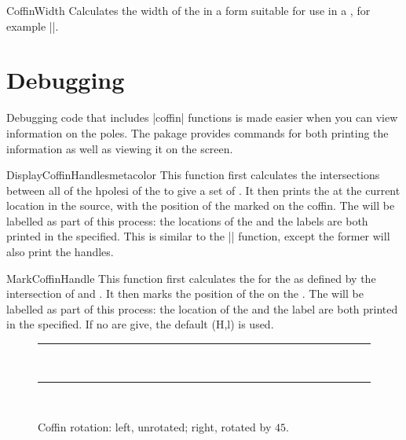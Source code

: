  \begin{docCommand}{CoffinWidth}{ }
   Calculates the width of the  in a form
   suitable for use in a , for example
   |\setlength{\mylength}{\CoffinWidth\ExampleCoffin}|.
 \end{docCommand} 
    
\section{Debugging}

Debugging code that includes |coffin| functions is made easier when you can view information on the
poles. The pakage provides commands for both printing the information as well as viewing it on the screen.

\begin{docCommand}{DisplayCoffinHandles}{meta{color}}
This function first calculates the intersections between all of the hpolesi of the  to
give a set of . It then prints the  at the current location in the source,
with the position of the  marked on the coffin. The  will be labelled
as part of this process: the locations of the  and the labels are both printed in
the  specified. This is similar to the |\TypesetCoffin| function, except the former will also print
the handles. 
\end{docCommand}
  
\begin{docCommand}{MarkCoffinHandle}{ }  
This function first calculates the  for the  as defined by the intersection
of  and . It then marks the position of the  on the . The
 will be labelled as part of this process: the location of the  and the
label are both printed in the  specified. If no  are give, the default (H,l) is
used.
\end{docCommand}
  
   \begin{figure}
     \hfil
     \SetHorizontalCoffin\ExampleCoffin
       {%
         \color{black!10!white}\rule{0.5 in}{1 in}^^A
         \color{black!20!white}\rule{0.5 in}{1 in}^^A
       }
     \begin{minipage}{0.4\textwidth}
       \DisplayCoffinHandles{}
     \end{minipage}
     \hfil
     \begin{minipage}{0.4\textwidth}
       \RotateCoffin{}
       \DisplayCoffinHandles{}
     \end{minipage}
     \hfil
     \caption{Coffin rotation: left, unrotated; right, rotated by
       $45$\textdegree.}
     \label{fgr:rotation}
   \end{figure}
   

